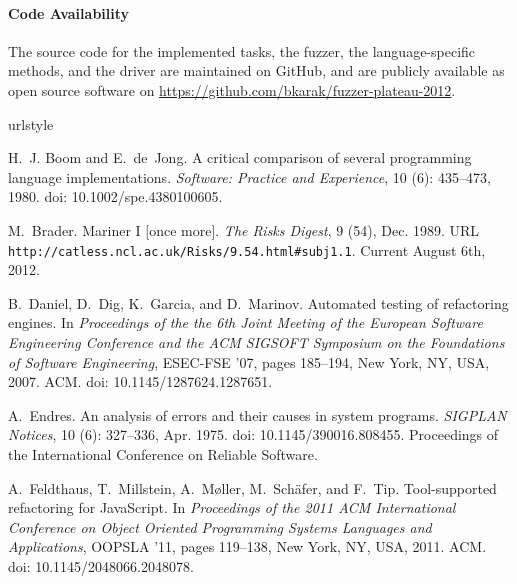 \documentclass[10pt]{sigplanconf}
\begin{document}
\paragraph{Code Availability} The source code for
the implemented tasks,
the fuzzer,
the language-specific methods, and
the driver are maintained on GitHub, and
are publicly available as open source software on \url{https://github.com/bkarak/fuzzer-plateau-2012}.



\begin{thebibliography}{35}
\providecommand{\natexlab}[1]{#1}
\providecommand{\url}[1]{\texttt{#1}}
\expandafter\ifx\csname urlstyle\endcsname\relax
  \providecommand{\doi}[1]{doi: #1}\else
  \providecommand{\doi}{doi: \begingroup \urlstyle{rm}\Url}\fi

H.~J. Boom and E.~de~Jong.
\newblock A critical comparison of several programming language
  implementations.
\newblock \emph{Software: Practice and Experience}, 10 (6):
  435--473, 1980.
\newblock \doi{10.1002/spe.4380100605}.

M.~Brader.
\newblock Mariner {I} [once more].
\newblock \emph{The Risks Digest}, 9 (54), Dec. 1989.
\newblock URL \url{http://catless.ncl.ac.uk/Risks/9.54.html#subj1.1}.
\newblock Current August 6th, 2012.

B.~Daniel, D.~Dig, K.~Garcia, and D.~Marinov.
\newblock Automated testing of refactoring engines.
\newblock In \emph{Proceedings of the the 6th Joint Meeting of the European
  Software Engineering Conference and the ACM SIGSOFT Symposium on the
  Foundations of Software Engineering}, ESEC-FSE '07, pages 185--194, New York,
  NY, USA, 2007. ACM.
\newblock \doi{10.1145/1287624.1287651}.

A.~Endres.
\newblock An analysis of errors and their causes in system programs.
\newblock \emph{SIGPLAN Notices}, 10 (6): 327--336, Apr.
  1975.
\newblock \doi{10.1145/390016.808455}.
\newblock Proceedings of the International Conference on Reliable Software.

A.~Feldthaus, T.~Millstein, A.~M{\o}ller, M.~Sch\"{a}fer, and F.~Tip.
\newblock Tool-supported refactoring for {JavaScript}.
\newblock In \emph{Proceedings of the 2011 ACM International Conference on
  Object Oriented Programming Systems Languages and Applications}, OOPSLA '11,
  pages 119--138, New York, NY, USA, 2011. ACM.
\newblock \doi{10.1145/2048066.2048078}.


\end{thebibliography}
\end{document}
